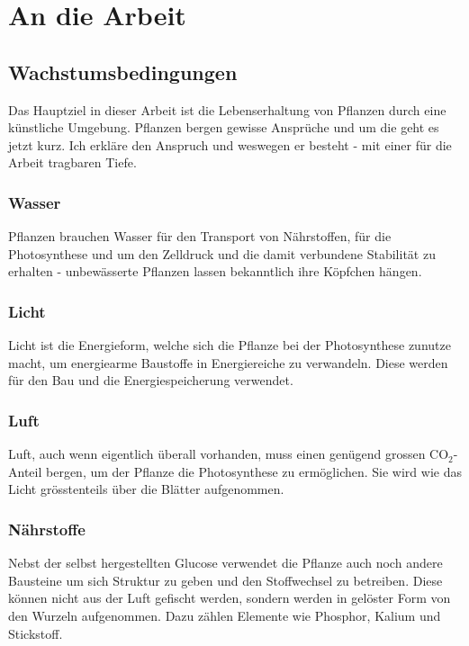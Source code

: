 \documentclass[12pt,titlepage,a4paper]{article}
\begin{document}
\section{An die Arbeit}
\subsection{Wachstumsbedingungen}
Das Hauptziel in dieser Arbeit ist die Lebenserhaltung von Pflanzen durch eine künstliche Umgebung. Pflanzen bergen gewisse Ansprüche und um die geht es jetzt kurz. Ich erkläre den Anspruch und weswegen er besteht - mit einer für die Arbeit tragbaren Tiefe.

\subsubsection{Wasser}
Pflanzen brauchen Wasser für den Transport von Nährstoffen, für die Photosynthese und um den Zelldruck und die damit verbundene Stabilität zu erhalten - unbewässerte Pflanzen lassen bekanntlich ihre Köpfchen hängen.


\subsubsection{Licht}
Licht ist die Energieform, welche sich die Pflanze bei der Photosynthese zunutze macht, um energiearme Baustoffe in Energiereiche zu verwandeln. Diese werden für den Bau und die Energiespeicherung verwendet. 

\subsubsection{Luft}
Luft, auch wenn eigentlich überall vorhanden, muss einen genügend grossen CO$_{2}$-Anteil bergen, um der Pflanze die Photosynthese zu ermöglichen. Sie wird wie das Licht grösstenteils über die Blätter aufgenommen.

\subsubsection{Nährstoffe}
Nebst der selbst hergestellten Glucose verwendet die Pflanze auch noch andere Bausteine um sich Struktur zu geben und den Stoffwechsel zu betreiben. Diese können nicht aus der Luft gefischt werden, sondern werden in gelöster Form von den Wurzeln aufgenommen. Dazu zählen Elemente wie Phosphor, Kalium und Stickstoff.
\newpage
\end{document}
